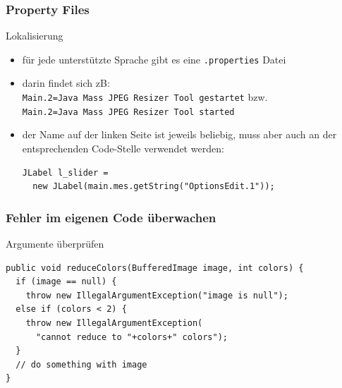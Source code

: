 \begin{frame}[fragile]
\frametitle{Property Files}
	\begin{block}{Lokalisierung}
	\begin{itemize}
	\item für jede unterstützte Sprache gibt es eine \texttt{.properties} Datei \pause
	\item darin findet sich zB: \\
\texttt{Main.2=Java Mass JPEG Resizer Tool gestartet} bzw.\\
\texttt{Main.2=Java Mass JPEG Resizer Tool started} \pause
	\item der Name auf der linken Seite ist jeweils beliebig, muss aber auch an der entsprechenden Code-Stelle verwendet werden:
	\begin{lstlisting}
JLabel l_slider = 
  new JLabel(main.mes.getString("OptionsEdit.1"));
	\end{lstlisting}
	\end{itemize}
	\end{block}
\end{frame}


\begin{frame}[fragile]
\frametitle{Fehler im eigenen Code überwachen}
	\begin{block}{Argumente überprüfen}
	\begin{lstlisting}
public void reduceColors(BufferedImage image, int colors) {
  if (image == null) {
    throw new IllegalArgumentException("image is null");
  else if (colors < 2) {
    throw new IllegalArgumentException(
      "cannot reduce to "+colors+" colors");
  }
  // do something with image
}
	\end{lstlisting}
	\end{block}
\end{frame}

